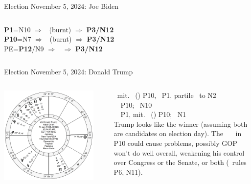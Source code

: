 \begin{frame}[t]{Election November 5, 2024: Joe Biden}
\begin{columns}[T, onlytextwidth]
\textbf{\dgreen P1}=N10
	$\Rightarrow$ \Mercury\, (burnt) $\Rightarrow$ \textbf{\dgreen P3/N12}\\
\textbf{\red P10}=N7
	$\Rightarrow$ \Mercury\, (burnt) $\Rightarrow$ \textbf{\dgreen P3/N12}\\
PE=\textbf{\dgreen P12}/N9
	 $\Rightarrow$ \Sun\, $\Rightarrow$ \textbf{\dgreen P3/N12}

\end{columns}
\end{frame}

\begin{frame}[t]{Election November 5, 2024: Donald Trump}
\small
\begin{columns}[T, onlytextwidth]
\vspace{-1em}
{\includegraphics[width=0.9\textwidth]{charts/Trump.png}}
\fontsize{6pt}{7pt}\selectfont

\Saturn\, mit. \Quincunx\, (\Opposition) P10, \Trine\, P1, partile \Sextile\, to N2 \\
\Mars\, \Trine\, P10; \Square\, N10 \\
\Mercury\, \Trine\, P1, mit. \Quincunx\, (\Opposition) P10; \Sextile\, N1 \\
\vspace{0.5em}
Trump looks like the winner (assuming both are candidates on election day). The \SouthNode\, \Conjunction\, \Moon\, in P10 could cause problems, possibly GOP won't do well overall, weakening his control over Congress or the Senate, or both (\Moon\, rules P6, N11).


\end{columns}
\end{frame}
